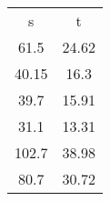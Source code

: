 \begin{table}
\begin{tabular}{cc}
s & t \\
61.5 & 24.62 \\
40.15 & 16.3 \\
39.7 & 15.91 \\
31.1 & 13.31 \\
102.7 & 38.98 \\
80.7 & 30.72 \\
\end{tabular}
\end{table}
